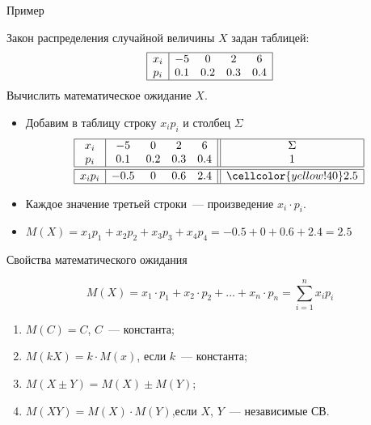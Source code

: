 \documentclass[unicode,11pt,notheorems,xcolor=table]{beamer}
\begin{document}
\begin{frame}{Пример}
    \begin{exampleblock}{}
        Закон распределения случайной величины $X$ задан таблицей:
        $$
        \begin{array}{|c|cccc|}
            \hline
            x_i & -5 & 0 & 2 & 6 \\
            p_i & 0.1 & 0.2 & 0.3 & 0.4\\
            \hline
        \end{array}
        $$
        Вычислить математическое ожидание $X$.
    \end{exampleblock}

    \begin{itemize}
        \item Добавим в таблицу строку $x_ip_i$ и столбец $\Sigma$
        $$
        \begin{array}{|c|cccc||c|}
            \hline
            x_i & -5 & 0 & 2 & 6 & \Sigma\\
            p_i & 0.1 & 0.2 & 0.3 & 0.4 & 1\\
            \hline
            \hline
            x_ip_i & -0.5 & 0 & 0.6 & 2.4 & \cellcolor{yellow!40} 2.5\\
            \hline
        \end{array}
        $$

        \item Каждое значение третьей строки~--- произведение $x_i\cdot p_i$.
        \item $M(X)= x_1p_1+x_2p_2+x_3p_3+x_4p_4 = -0.5+0+0.6+2.4=2.5$
    \end{itemize}
\end{frame}


\begin{frame}{Свойства математического ожидания}{}
    \begin{block}{}
    $$
        M(X) = x_1\cdot p_1 + x_2 \cdot p_2 + \ldots + x_n \cdot p_n = \sum_{i=1}^n x_i p_i
    $$
    \end{block}
    \begin{enumerate}
        \item  $M(C) = C$,  $C$~--- константа;
        \item  $M(kX) = k\cdot M(x)$, \hfill если $k$~--- константа;
        \item $M(X \pm Y) = M(X) \pm M(Y)$;
        \item $M(XY) = M(X) \cdot M(Y)$,\hfill если $X$, $Y$~--- независимые СВ.
    \end{enumerate}
\end{frame}
\end{document}
